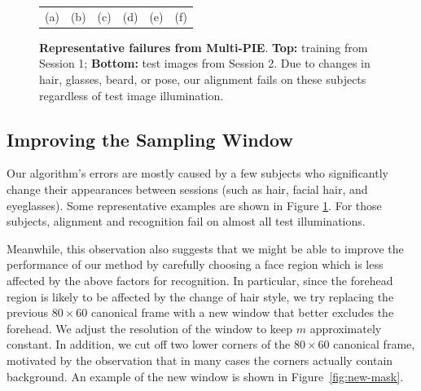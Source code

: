 \documentclass[10pt,journal,letterpaper,compsoc]{IEEEtran} %
\begin{document}
\begin{figure}
{\begin{tabular}{@{}c@{}c@{}c@{}c@{}c@{}c@{}}
\hspace{-2mm}(a) & (b) & (c) & (d) & (e) & (f) \vspace{0mm}
\end{tabular}
}
\caption{{\bf Representative failures from Multi-PIE}. {\bf Top:} training from Session 1; {\bf Bottom:} test images from Session 2. Due to changes in hair, glasses, beard, or pose, our alignment fails on these subjects regardless of test image illumination.}
\label{fig:failed-examples}
\vspace{-4mm}
\end{figure}

\subsection{Improving the Sampling Window}
Our algorithm's errors are mostly caused by a few subjects who
significantly change their appearances between sessions (such
as hair, facial hair, and eyeglasses). Some representative
examples are shown in Figure \ref{fig:failed-examples}. For those subjects, alignment and recognition fail on
almost all test illuminations.

Meanwhile, this observation also suggests that we might be able
to improve the performance of our method by carefully choosing
a face region which is less affected by the above factors for
recognition. In particular, since the forehead region is likely
to be affected by the change of hair style, we try replacing
the previous $80 \times 60$ canonical frame with a new
window that better excludes the forehead. We adjust the
resolution of the window to keep $m$ approximately constant. In addition,
we cut off two lower corners of the $80 \times 60$ canonical frame, motivated by
the observation that in many cases the corners
actually contain background. An example of the new window
is shown in Figure~\ref{fig:new-mask}.
\end{document}
